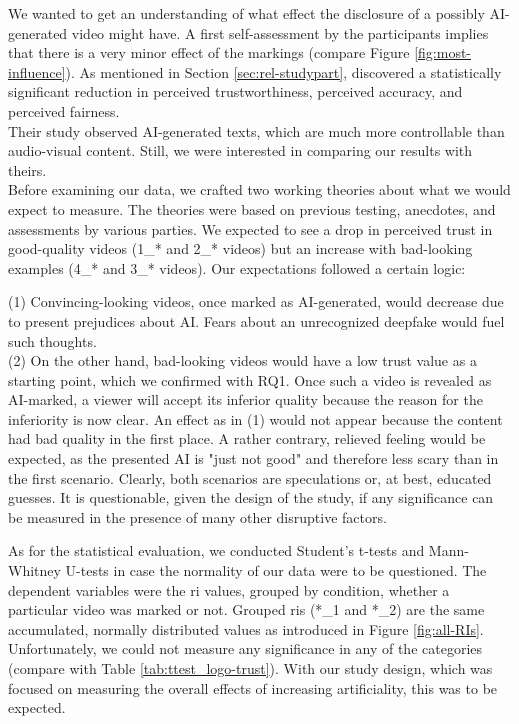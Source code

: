 \documentclass[
  a4paper,  %
  twoside,  %
  bibliography=totoc,
  headsepline,
  cleardoublepage=empty,
  parskip=half,
  draft=false
]{scrbook}
\begin{document}
We wanted to get an understanding of what effect the disclosure of a possibly AI-generated video might have. A first self-assessment by the participants implies that there is a very minor effect of the markings (compare Figure \ref{fig:most-influence}). As mentioned in Section \ref{sec:rel-studypart},  discovered a statistically significant reduction in perceived trustworthiness, perceived accuracy, and perceived fairness. \\
Their study observed AI-generated texts, which are much more controllable than audio-visual content. Still, we were interested in comparing our results with theirs. \\
Before examining our data, we crafted two working theories about what we would expect to measure. The theories were based on previous testing, anecdotes, and assessments by various parties. We expected to see a drop in perceived trust in good-quality videos (1\_* and 2\_* videos) but an increase with bad-looking examples (4\_* and 3\_* videos). Our expectations followed a certain logic:

(1) Convincing-looking videos, once marked as AI-generated, would decrease due to present prejudices about AI. Fears about an unrecognized deepfake would fuel such thoughts. \\
(2) On the other hand, bad-looking videos would have a low trust value as a starting point, which we confirmed with RQ1. Once such a video is revealed as AI-marked, a viewer will accept its inferior quality because the reason for the inferiority is now clear. An effect as in (1) would not appear because the content had bad quality in the first place. A rather contrary, relieved feeling would be expected, as the presented AI is "just not good" and therefore less scary than in the first scenario. Clearly, both scenarios are speculations or, at best, educated guesses. It is questionable, given the design of the study, if any significance can be measured in the presence of many other disruptive factors.

As for the statistical evaluation, we conducted Student's t-tests and Mann-Whitney U-tests in case the normality of our data were to be questioned. The dependent variables were the \gls{ri} values, grouped by condition, whether a particular video was marked or not. Grouped \gls{ri}s (*\_1 and *\_2) are the same accumulated, normally distributed values as introduced in Figure \ref{fig:all-RIs}. Unfortunately, we could not measure any significance in any of the categories (compare with Table \ref{tab:ttest_logo-trust}). With our study design, which was focused on measuring the overall effects of increasing artificiality, this was to be expected.
\end{document}
